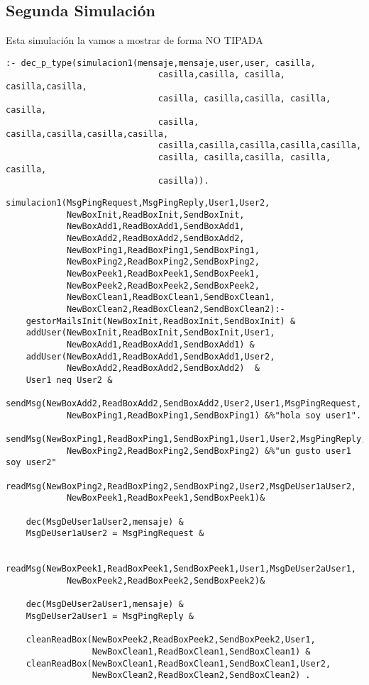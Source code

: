 \subsection{Segunda Simulación}
Esta simulación la vamos a mostrar de forma NO TIPADA
\begin{verbatim}
:- dec_p_type(simulacion1(mensaje,mensaje,user,user, casilla, 
                              casilla,casilla, casilla, casilla,casilla,
                              casilla, casilla,casilla, casilla, casilla,
                              casilla, casilla,casilla,casilla,casilla,
                              casilla,casilla,casilla,casilla,casilla,      
                              casilla, casilla,casilla, casilla, casilla,
                              casilla)).
\end{verbatim}
\newpage
\begin{verbatim}
simulacion1(MsgPingRequest,MsgPingReply,User1,User2,
            NewBoxInit,ReadBoxInit,SendBoxInit,
            NewBoxAdd1,ReadBoxAdd1,SendBoxAdd1,
            NewBoxAdd2,ReadBoxAdd2,SendBoxAdd2,
            NewBoxPing1,ReadBoxPing1,SendBoxPing1,
            NewBoxPing2,ReadBoxPing2,SendBoxPing2,
            NewBoxPeek1,ReadBoxPeek1,SendBoxPeek1,
            NewBoxPeek2,ReadBoxPeek2,SendBoxPeek2,
            NewBoxClean1,ReadBoxClean1,SendBoxClean1, 
            NewBoxClean2,ReadBoxClean2,SendBoxClean2):-
    gestorMailsInit(NewBoxInit,ReadBoxInit,SendBoxInit) &
    addUser(NewBoxInit,ReadBoxInit,SendBoxInit,User1,
            NewBoxAdd1,ReadBoxAdd1,SendBoxAdd1) &
    addUser(NewBoxAdd1,ReadBoxAdd1,SendBoxAdd1,User2,
            NewBoxAdd2,ReadBoxAdd2,SendBoxAdd2)  &
    User1 neq User2 &
    sendMsg(NewBoxAdd2,ReadBoxAdd2,SendBoxAdd2,User2,User1,MsgPingRequest,
            NewBoxPing1,ReadBoxPing1,SendBoxPing1) &%"hola soy user1".
    sendMsg(NewBoxPing1,ReadBoxPing1,SendBoxPing1,User1,User2,MsgPingReply,
            NewBoxPing2,ReadBoxPing2,SendBoxPing2) &%"un gusto user1 soy user2"
    readMsg(NewBoxPing2,ReadBoxPing2,SendBoxPing2,User2,MsgDeUser1aUser2,
            NewBoxPeek1,ReadBoxPeek1,SendBoxPeek1)&
    
    dec(MsgDeUser1aUser2,mensaje) &
    MsgDeUser1aUser2 = MsgPingRequest &

    readMsg(NewBoxPeek1,ReadBoxPeek1,SendBoxPeek1,User1,MsgDeUser2aUser1,
            NewBoxPeek2,ReadBoxPeek2,SendBoxPeek2)&
    
    dec(MsgDeUser2aUser1,mensaje) &
    MsgDeUser2aUser1 = MsgPingReply &

    cleanReadBox(NewBoxPeek2,ReadBoxPeek2,SendBoxPeek2,User1,
                 NewBoxClean1,ReadBoxClean1,SendBoxClean1) &
    cleanReadBox(NewBoxClean1,ReadBoxClean1,SendBoxClean1,User2,
                 NewBoxClean2,ReadBoxClean2,SendBoxClean2) .
\end{verbatim}
